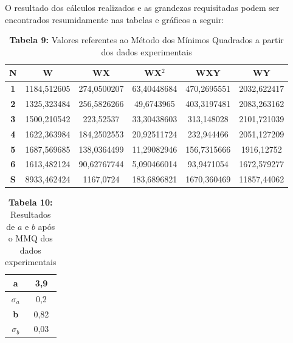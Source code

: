 \documentclass{article}
\begin{document}
O resultado dos cálculos realizados e as grandezas requisitadas podem ser encontrados resumidamente nas tabelas e gráficos a seguir:

\begin{table}[!ht]
	\begin{center}
		\caption*{\textbf{Tabela 9:} Valores referentes ao Método dos Mínimos Quadrados a partir dos dados experimentais}
		\begin{tabular}{| c | c | c | c | c | c |}
			\hline  \multicolumn{1}{|c|}{\textbf{N}} & \multicolumn{1}{c|}{\textbf{W}} & \multicolumn{1}{c|}{\textbf{WX}} & \multicolumn{1}{c|}{\textbf{WX$^2$}} & \multicolumn{1}{c|}{WXY} & \multicolumn{1}{c|}{WY} \\  \hline
			\multicolumn{0}{|c|}{\textbf{1}} & 1184,512605&274,0500207&63,40448684&470,2695551&2032,622417 \\ \hline
			\multicolumn{0}{|c|}{\textbf{2}} &1325,323484&256,5826266&49,6743965&403,3197481&2083,263162 \\ \hline
			\multicolumn{0}{|c|}{\textbf{3}} &1500,210542&223,52537&33,30438603&313,148028&2101,721039 \\ \hline
			\multicolumn{0}{|c|}{\textbf{4}} &1622,363984&184,2502553&20,92511724&232,944466&2051,127209 \\ \hline
			\multicolumn{0}{|c|}{\textbf{5}} & 1687,569685&138,0364499&11,29082946&156,7315666&1916,12752 \\ \hline
			\multicolumn{0}{|c|}{\textbf{6}} &1613,482124&90,62767744&5,090466014&93,9471054&1672,579277 \\ \hline
			\multicolumn{0}{|c|}{\textbf{S}}&8933,462424&1167,0724&183,6896821&1670,360469&11857,44062\\ \hline
		\end{tabular}
	\end{center}
\end{table}

\begin{table}[!ht]
	\begin{center}
		\caption*{\textbf{Tabela 10:} Resultados de $a$ e $b$ após o MMQ dos dados experimentais}
		\begin{tabular}{| c | c |}
			\hline 
			\multicolumn{0}{|c|}{\textbf{a}} & 3,9 \\ \hline
			\multicolumn{0}{|c|}{\textbf{$\sigma_a$}} & 0,2 \\ \hline
			\multicolumn{0}{|c|}{\textbf{b}} & 0,82\\ \hline
			\multicolumn{0}{|c|}{\textbf{$\sigma_b$}} & 0,03 \\ \hline
	\end{tabular}
	\end{center}
\end{table}
\end{document}
